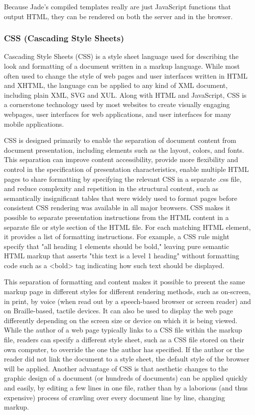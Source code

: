 Because Jade's compiled templates really are just JavaScript functions that output
HTML, they can be rendered on both the server and in the browser.\cite{2}
\subsubsection{CSS (Cascading Style Sheets)}
Cascading Style Sheets (CSS) is a style sheet language used for describing the look and formatting of a document written in a markup language. While most often used to change the style of web pages and user interfaces written in HTML and XHTML, the language can be applied to any kind of XML document, including plain XML, SVG and XUL. Along with HTML and JavaScript, CSS is a cornerstone technology used by most websites to create visually engaging webpages, user interfaces for web applications, and user interfaces for many mobile applications.\cite{22}


CSS is designed primarily to enable the separation of document content from document presentation, including elements such as the layout, colors, and fonts. This separation can improve content accessibility, provide more flexibility and control in the specification of presentation characteristics, enable multiple HTML pages to share formatting by specifying the relevant CSS in a separate .css file, and reduce complexity and repetition in the structural content, such as semantically insignificant tables that were widely used to format pages before consistent CSS rendering was available in all major browsers. CSS makes it possible to separate presentation instructions from the HTML content in a separate file or style section of the HTML file. For each matching HTML element, it provides a list of formatting instructions. For example, a CSS rule might specify that "all heading 1 elements should be bold," leaving pure semantic HTML markup that asserts "this text is a level 1 heading" without formatting code such as a <bold> tag indicating how such text should be displayed.\cite{22}


This separation of formatting and content makes it possible to present the same markup page in different styles for different rendering methods, such as on-screen, in print, by voice (when read out by a speech-based browser or screen reader) and on Braille-based, tactile devices. It can also be used to display the web page differently depending on the screen size or device on which it is being viewed. While the author of a web page typically links to a CSS file within the markup file, readers can specify a different style sheet, such as a CSS file stored on their own computer, to override the one the author has specified. If the author or the reader did not link the document to a style sheet, the default style of the browser will be applied. Another advantage of CSS is that aesthetic changes to the graphic design of a document (or hundreds of documents) can be applied quickly and easily, by editing a few lines in one file, rather than by a laborious (and thus expensive) process of crawling over every document line by line, changing markup.\cite{22}


